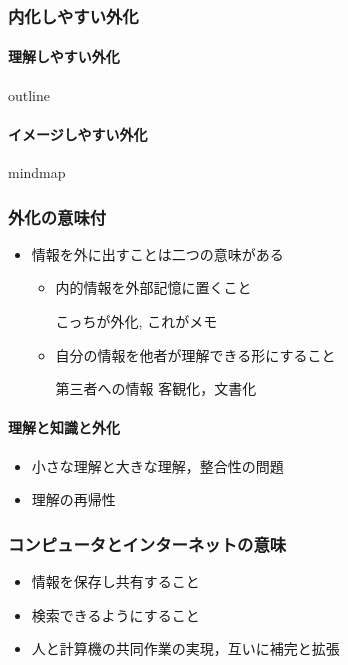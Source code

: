 \documentclass[dvipdfmx,11pat]{jarticle}
\begin{document}
\subsubsection*{内化しやすい外化}
\label{sec:org8d28200}

\paragraph*{理解しやすい外化}
\label{sec:org953eeab}

outline 

\paragraph*{イメージしやすい外化}
\label{sec:orgdfec351}

mindmap

\subsubsection*{外化の意味付}
\label{sec:org26ba242}

\begin{itemize}
\item 情報を外に出すことは二つの意味がある

\begin{itemize}
\item 内的情報を外部記憶に置くこと

こっちが外化, これがメモ

\item 自分の情報を他者が理解できる形にすること

第三者への情報 客観化，文書化
\end{itemize}
\end{itemize}

\paragraph*{理解と知識と外化}
\label{sec:org581ecea}

\begin{itemize}
\item 小さな理解と大きな理解，整合性の問題
\item 理解の再帰性
\end{itemize}

\subsubsection*{コンピュータとインターネットの意味}
\label{sec:org16ebd17}

\begin{itemize}
\item 情報を保存し共有すること
\item 検索できるようにすること
\item 人と計算機の共同作業の実現，互いに補完と拡張
\end{itemize}
\end{document}
